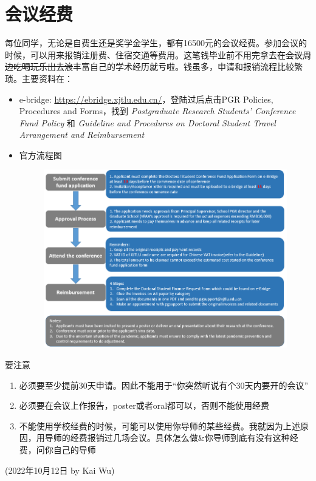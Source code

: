 \section{会议经费}
\label{section:fund}

每位同学，无论是自费生还是奖学金学生，都有16500元的会议经费。参加会议的时候，可以用来报销注册费、住宿交通等费用。这笔钱毕业前不用完拿去\sout{在会议周边吃喝玩乐出去浪}丰富自己的学术经历就亏啦。钱虽多，申请和报销流程比较繁琐。主要资料在：
\begin{itemize}
    \item e-bridge: \url{https://ebridge.xjtlu.edu.cn/}，登陆过后点击PGR Policies, Procedures and Forms，找到 \textit{Postgraduate Research Students' Conference Fund Policy} 和 \textit{
    Guideline and Procedures on Doctoral Student Travel Arrangement and Reimbursement}
    \item 官方流程图
    \begin{figure}[H]
        \centering
        \includegraphics[width=0.9\columnwidth]{author-folder/Kai.Wu/fund-flowchart.png}
    \end{figure}
\end{itemize}

要注意
\begin{enumerate}
    \item 必须要至少提前30天申请。因此不能用于“你突然听说有个30天内要开的会议”
    \item 必须要在会议上作报告，poster或者oral都可以，否则不能使用经费
    \item 不能使用学校经费的时候，可能可以使用你导师的某些经费。我就因为上述原因，用导师的经费报销过几场会议。具体怎么做\&你导师到底有没有这种经费，问你自己的导师
\end{enumerate}


\begin{flushright}
(2022年10月12日 by Kai Wu)
\end{flushright}